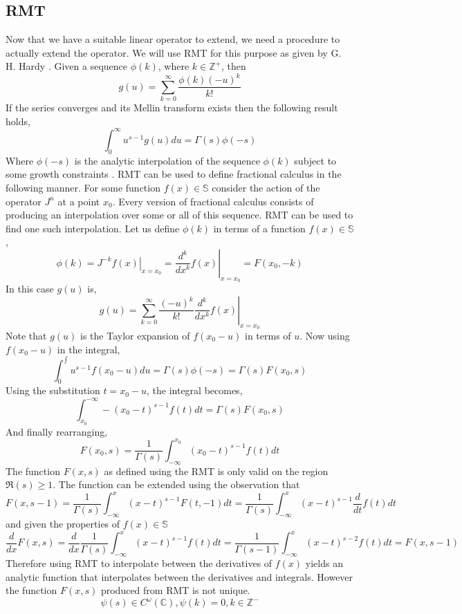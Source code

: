 \documentclass[%
 onecolumn,
 amsmath, amssymb, aps, pra, 10pt
]{revtex4-2}
\begin{document}
\subsection{RMT}
Now that we have a suitable linear operator to extend, we need a procedure to actually extend the operator. We will use RMT for this purpose as given by G. H. Hardy \cite[p.~186]{hardy1940ramanujan}. Given a sequence $\phi(k)$, where $k \in \mathbb{Z}^+$, then
\[g(u) = \sum_{k=0}^\infty \frac{\phi(k)(-u)^k}{k!}\]
If the series converges and its Mellin transform exists then the following result holds,
\[\int_0^{\infty} u^{s-1}g(u)du = \Gamma(s)\phi(-s)\]
Where $\phi(-s)$ is the analytic interpolation of the sequence $\phi(k)$ subject to some growth constraints \cite[p.~188--189]{hardy1940ramanujan}.
RMT can be used to define fractional calculus in the following manner. For some function $f(x) \in \mathbb{S}$ consider the action of the operator $J^n$ at a point $x_0$. Every version of fractional calculus consists of producing an interpolation over some or all of this sequence. RMT can be used to find one such interpolation. Let us define $\phi(k)$ in terms of a function $f(x) \in \mathbb{S}$ ,
\[\phi(k) = \left. J^{-k}f(x)\right|_{x = x_0} = \left. \frac{d^k}{dx^k}f(x) \right|_{x = x_0} = F(x_0, -k)\]
In this case $g(u)$ is,
\[g(u) = \sum_{k=0}^\infty \frac{(-u)^k}{k!} \left. \frac{d^k}{dx^k}f(x)\right|_{x=x_0}\]
Note that $g(u)$ is the Taylor expansion of $f(x_0 - u)$ in terms of $u$. Now using $f(x_0 - u)$ in the integral,
\[\int_0^{\int} u^{s-1}f(x_0 - u)du = \Gamma(s)\phi(-s) = \Gamma(s)F(x_0, s)\]
Using the substitution $t = x_0 - u$, the integral becomes,
\[\int_{x_0}^{-\infty} -(x_0 - t)^{s-1}f(t)dt = \Gamma(s)F(x_0, s)\]
And finally rearranging,
\[F(x_0, s) = \frac{1}{\Gamma(s)} \int_{-\infty}^{x_0} (x_0 - t)^{s-1} f(t)dt\]
The function $F(x, s)$ as defined using the RMT is only valid on the region $\mathfrak{R}(s) \geq 1$. The function can be extended using the observation that
\[F(x, s-1) = \frac{1}{\Gamma(s)} \int_{-\infty}^{x} (x - t)^{s-1} F(t, -1)dt = \frac{1}{\Gamma(s)} \int_{-\infty}^{x} (x - t)^{s-1} \frac{d}{dt}f(t)dt\]
and given the properties of $f(x) \in \mathbb{S}$
\[\frac{d}{dx}F(x, s) = \frac{d}{dx}\frac{1}{\Gamma(s)} \int_{-\infty}^{x} (x - t)^{s-1} f(t)dt = \frac{1}{\Gamma(s - 1)} \int_{-\infty}^{x} (x - t)^{s - 2} f(t)dt = F(x, s - 1)\]
Therefore using RMT to interpolate between the derivatives of $f(x)$ yields an analytic function that interpolates between the derivatives and integrals. However the function $F(x, s)$ produced from RMT is not unique.
\[\psi(s) \in C^{\omega}(\mathbb{C}), \psi(k) = 0, k \in \mathbb{Z}^-\]
\end{document}
